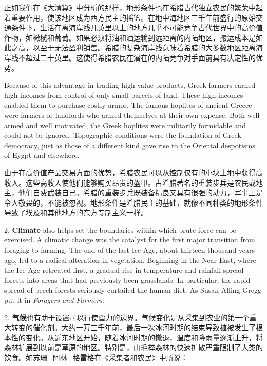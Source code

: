 \begin{Parallel}{97mm}{45mm}
  \ParallelRText
  {正如我们在《大清算》中分析的那样，地形条件也在希腊古代独立农民的繁荣中起着重要作用，使该地区成为西方民主的摇篮。在地中海地区三千年前盛行的原始交通条件下，生活在离海岸线几英里以上的地方几乎不可能竞争古代世界中的高价值作物，如橄榄和葡萄。如果必须将油和酒运输到远距离的内陆地区，搬运成本是如此之高，以至于无法盈利销售。希腊的复杂海岸线意味着希腊的大多数地区距离海岸线不超过二十英里。这使得希腊农民在潜在的内陆竞争对手面前具有决定性的优势。}
  \ParallelPar


  \ParallelLText
  {Because of this advantage in trading high-value products, Greek farmers earned high incomes from control of only small parcels of land. These high incomes enabled them to purchase costly armor. The famous hoplites of ancient Greece were farmers or landlords who armed themselves at their own expense. Both well armed and well motivated, the Greek hoplites were militarily formidable and could not be ignored. Topographic conditions were the foundation of Greek democracy, just as those of a different kind gave rise to the Oriental despotisms of Eygpt and elsewhere.}
  
  \ParallelRText
  {由于在高价值产品交易方面的优势，希腊农民可以从控制仅有的小块土地中获得高收入。这些高收入使他们能够购买昂贵的盔甲。古希腊著名的重装步兵是农民或地主，他们自费武装自己。希腊的重装步兵既装备精良又具有很强的动力，军事上是令人敬畏的，不能被忽视。地形条件是希腊民主的基础，就像不同种类的地形条件导致了埃及和其他地方的东方专制主义一样。}
  \ParallelPar


  \ParallelLText
  {2. \textbf{Climate} also helps set the boundaries within which brute force can be exercised. A climatic change was the catalyst for the first major transition from foraging to farming. The end of the last Ice Age, about thirteen thousand years ago, led to a radical alteration in vegetation. Beginning in the Near East, where the Ice Age retreated first, a gradual rise in temperature and rainfall spread forests into areas that had previously been grasslands. In particular, the rapid spread of beech forests seriously curtailed the human diet. As Susan Alling Gregg put it in \emph{Foragers and Farmers}:}
  
  \ParallelRText
  {2. \textbf{气候}也有助于设置可以行使蛮力的边界。气候变化是从采集到农业的第一个重大转变的催化剂。大约一万三千年前，最后一次冰河时期的结束导致植被发生了根本性的变化。从近东地区开始，随着冰河时期的撤退，温度和降雨量逐渐上升，将森林扩展到以前是草原的地区。特别是，山毛榉森林的快速扩散严重限制了人类的饮食。如苏珊·阿林·格雷格在《采集者和农民》中所说：}
  \ParallelPar



\end{Parallel}
